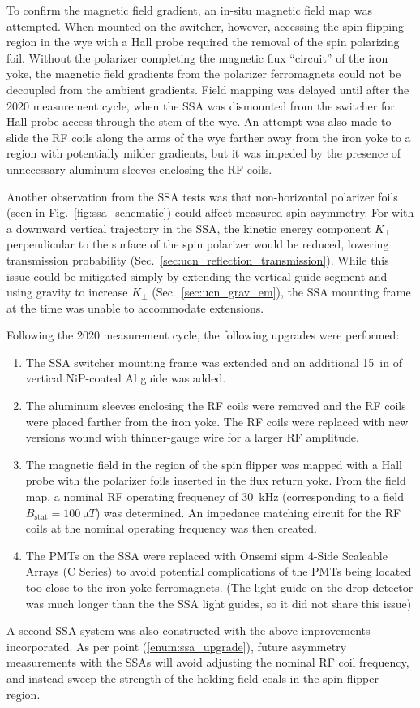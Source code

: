 To confirm the magnetic field gradient, an in-situ magnetic field map was attempted. When mounted on the switcher, however, accessing the spin flipping region in the wye with a Hall probe required the removal of the spin polarizing foil. Without the polarizer completing the magnetic flux ``circuit'' of the iron yoke, the magnetic field gradients from the polarizer ferromagnets could not be decoupled from the ambient gradients. Field mapping was delayed until after the 2020 measurement cycle, when the SSA was dismounted from the switcher for Hall probe access through the stem of the wye. An attempt was also made to slide the RF coils along the arms of the wye farther away from the iron yoke to a region with potentially milder gradients, but it was impeded by the presence of unnecessary aluminum sleeves enclosing the RF coils.

Another observation from the SSA tests was that non-horizontal polarizer foils (seen in Fig.~\ref{fig:ssa_schematic}) could affect measured spin asymmetry. For \ucn with a downward vertical trajectory in the SSA, the kinetic energy component $K_\perp$ perpendicular to the surface of the spin polarizer would be reduced, lowering transmission probability (Sec.~\ref{sec:ucn_reflection_transmission}). While this issue could be mitigated simply by extending the vertical guide segment and using gravity to increase $K_\perp$ (Sec.~\ref{sec:ucn_grav_em}), the SSA mounting frame at the time was unable to accommodate extensions.

Following the 2020 measurement cycle, the following upgrades were performed:
%
\begin{enumerate}
    \item The SSA switcher mounting frame was extended and an additional \qty{15}{in} of vertical NiP-coated Al guide was added.
    \item The aluminum sleeves enclosing the RF coils were removed and the RF coils were placed farther from the iron yoke. The RF coils were replaced with new versions wound with thinner-gauge wire for a larger RF amplitude.
    \item The magnetic field in the region of the spin flipper was mapped with a Hall probe with the polarizer foils inserted in the flux return yoke. From the field map, a nominal RF operating frequency of \qty{30}{kHz} (corresponding to a field $B_\text{stat}=\qty{100}{\micro T}$) was determined. An impedance matching circuit for the RF coils at the nominal operating frequency was then created.\label{enum:ssa_upgrade}
    \item The PMTs on the SSA were replaced with Onsemi \acrshort{sipm} 4-Side Scaleable Arrays (C Series) to avoid potential complications of the PMTs being located too close to the iron yoke ferromagnets. (The light guide on the drop detector was much longer than the the SSA light guides, so it did not share this issue)
\end{enumerate}
%
A second SSA system was also constructed with the above improvements incorporated. As per point (\ref{enum:ssa_upgrade}), future asymmetry measurements with the SSAs will avoid adjusting the nominal RF coil frequency, and instead sweep the strength of the holding field coals in the spin flipper region.
